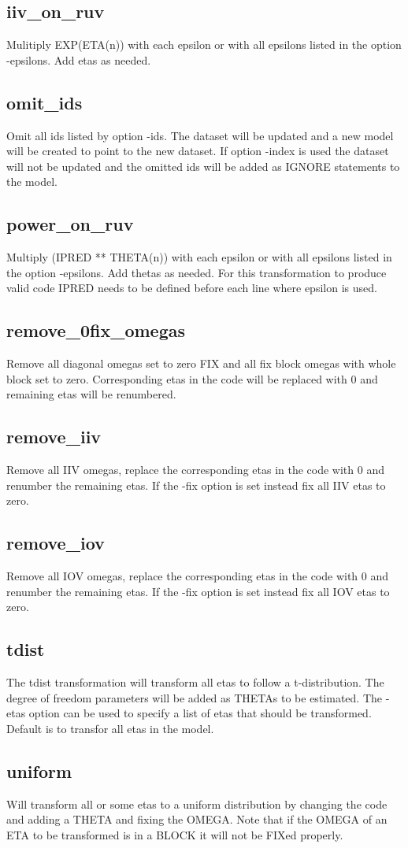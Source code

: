 \subsection{iiv\_on\_ruv}
Mulitiply EXP(ETA(n)) with each epsilon or with all epsilons listed in the option -epsilons. Add etas as needed.

\subsection{omit\_ids}
Omit all ids listed by option -ids. The dataset will be updated and a new model will be created to point to the new dataset. If option -index is used the dataset will not be updated and the omitted ids will be added as IGNORE statements to the model.

\subsection{power\_on\_ruv}
Multiply (IPRED ** THETA(n)) with each epsilon or with all epsilons listed in the option -epsilons. Add thetas as needed. For this transformation to produce valid code IPRED needs to be defined before each line where epsilon is used.

\subsection{remove\_0fix\_omegas}
Remove all diagonal omegas set to zero FIX and all fix block omegas with whole block set to zero. Corresponding etas in the code will be replaced with 0 and remaining etas will be renumbered.

\subsection{remove\_iiv}
Remove all IIV omegas, replace the corresponding etas in the code with 0 and renumber the remaining etas. If the -fix option is set instead fix all IIV etas to zero.

\subsection{remove\_iov}
Remove all IOV omegas, replace the corresponding etas in the code with 0 and renumber the remaining etas. If the -fix option is set instead fix all IOV etas to zero.

\subsection{tdist}
The tdist transformation will transform all etas to follow a t-distribution. The degree of freedom parameters will be added as THETAs to be estimated. The -etas option can be used to specify a list of etas that should be transformed. Default is to transfor all etas in the model.

\subsection{uniform}
Will transform all or some etas to a uniform distribution by changing the code and adding a THETA and fixing the OMEGA. Note that if the OMEGA of an ETA to be transformed is in a BLOCK it will not be FIXed properly.


